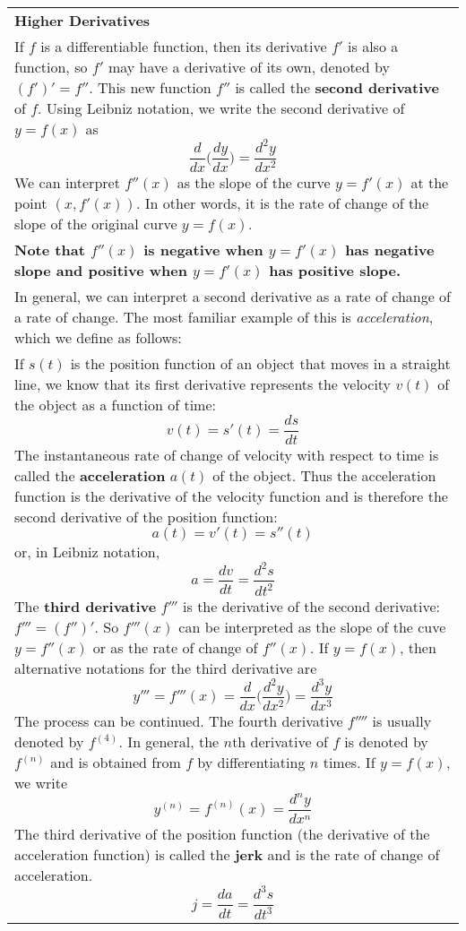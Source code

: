 \documentclass[fleqn]{article}
\begin{document}
\begin{center}
\def\arraystretch{1.3}
{\setlength{\tabcolsep}{16pt}
\begin{tabularx}{.9\textwidth}{|X|}
\hline
	\vspace{1pt}
	\textbf{Higher Derivatives} \\
	If $f$ is a differentiable function, then its derivative $f'$ is also a function, so $f'$ may have a derivative of its own, denoted by $(f')' = f''$. This new function $f''$ is called the \textbf{second derivative} of $f$. Using Leibniz notation, we write the second derivative of $y = f(x)$ as
	$$\dfrac{d}{dx} \Big( \dfrac{dy}{dx} \Big) = \dfrac{d^2 y}{dx^2}$$
	We can interpret $f''(x)$ as the slope of the curve $y= f'(x)$ at the point $(x, f'(x))$. In other words, it is the rate of change of the slope of the original curve $y = f(x)$. \\[5pt]
	\textbf{Note that $f''(x)$ is negative when $y = f'(x)$ has negative slope and positive when $y = f'(x)$ has positive slope.} \\[5pt]
	In general, we can interpret a second derivative as a rate of change of a rate of change. The most familiar example of this is \textit{acceleration}, which we define as follows:\\[3pt]
	If $s(t)$ is the position function of an object that moves in a straight line, we know that its first derivative represents the velocity $v(t)$ of the object as a function of time:
	$$v(t) = s'(t) = \dfrac{ds}{dt}$$
	The instantaneous rate of change of velocity with respect to time is called the \textbf{acceleration} $a(t)$ of the object. Thus the acceleration function is the derivative of the velocity function and is therefore the second derivative of the position function:
	$$a(t) = v'(t) = s''(t)$$
	or, in Leibniz notation, 
	$$a = \dfrac{dv}{dt} = \dfrac{d^2 s}{dt^2}$$
	The \textbf{third derivative} $f'''$ is the derivative of the second derivative: $f''' = (f'')'$. So $f'''(x)$ can be interpreted as the slope of the cuve $y = f''(x)$ or as the rate of change of $f''(x)$. If $y = f(x)$, then alternative notations for the third derivative are
	$$y''' = f'''(x) = \dfrac{d}{dx} \Big( \dfrac{d^2 y}{dx^2} \Big) = \dfrac{d^3 y}{dx^3}$$
	The process can be continued. The fourth derivative $f''''$ is usually denoted by $f^{(4)}$. In general, the $n$th derivative of $f$ is denoted by $f^{(n)}$ and is obtained from $f$ by differentiating $n$ times. If $y = f(x)$, we write
	$$y^{(n)} = f^{(n)}(x) = \dfrac{d^n y}{dx^n}$$
	The third derivative of the position function (the derivative of the acceleration function) is called the \textbf{jerk} and is the rate of change of acceleration.
	$$j = \dfrac{da}{dt} = \dfrac{d^3 s}{dt^3}$$
	\\
	\hline
\end{tabularx}}
\vspace{12pt}

\end{center}
\end{document}
